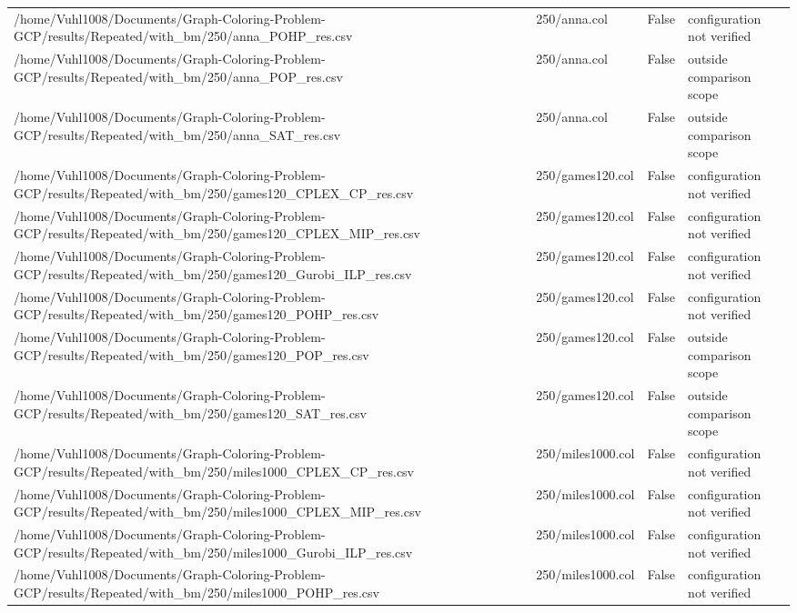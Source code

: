 \begin{table}[htbp]
\begin{tabular}{llll}
/home/Vuhl1008/Documents/Graph-Coloring-Problem-GCP/results/Repeated/with\_bm/250/anna\_POHP\_res.csv & 250/anna.col & False & configuration not verified \\
/home/Vuhl1008/Documents/Graph-Coloring-Problem-GCP/results/Repeated/with\_bm/250/anna\_POP\_res.csv & 250/anna.col & False & outside comparison scope \\
/home/Vuhl1008/Documents/Graph-Coloring-Problem-GCP/results/Repeated/with\_bm/250/anna\_SAT\_res.csv & 250/anna.col & False & outside comparison scope \\
/home/Vuhl1008/Documents/Graph-Coloring-Problem-GCP/results/Repeated/with\_bm/250/games120\_CPLEX\_CP\_res.csv & 250/games120.col & False & configuration not verified \\
/home/Vuhl1008/Documents/Graph-Coloring-Problem-GCP/results/Repeated/with\_bm/250/games120\_CPLEX\_MIP\_res.csv & 250/games120.col & False & configuration not verified \\
/home/Vuhl1008/Documents/Graph-Coloring-Problem-GCP/results/Repeated/with\_bm/250/games120\_Gurobi\_ILP\_res.csv & 250/games120.col & False & configuration not verified \\
/home/Vuhl1008/Documents/Graph-Coloring-Problem-GCP/results/Repeated/with\_bm/250/games120\_POHP\_res.csv & 250/games120.col & False & configuration not verified \\
/home/Vuhl1008/Documents/Graph-Coloring-Problem-GCP/results/Repeated/with\_bm/250/games120\_POP\_res.csv & 250/games120.col & False & outside comparison scope \\
/home/Vuhl1008/Documents/Graph-Coloring-Problem-GCP/results/Repeated/with\_bm/250/games120\_SAT\_res.csv & 250/games120.col & False & outside comparison scope \\
/home/Vuhl1008/Documents/Graph-Coloring-Problem-GCP/results/Repeated/with\_bm/250/miles1000\_CPLEX\_CP\_res.csv & 250/miles1000.col & False & configuration not verified \\
/home/Vuhl1008/Documents/Graph-Coloring-Problem-GCP/results/Repeated/with\_bm/250/miles1000\_CPLEX\_MIP\_res.csv & 250/miles1000.col & False & configuration not verified \\
/home/Vuhl1008/Documents/Graph-Coloring-Problem-GCP/results/Repeated/with\_bm/250/miles1000\_Gurobi\_ILP\_res.csv & 250/miles1000.col & False & configuration not verified \\
/home/Vuhl1008/Documents/Graph-Coloring-Problem-GCP/results/Repeated/with\_bm/250/miles1000\_POHP\_res.csv & 250/miles1000.col & False & configuration not verified \\

\end{tabular}
\end{table}
